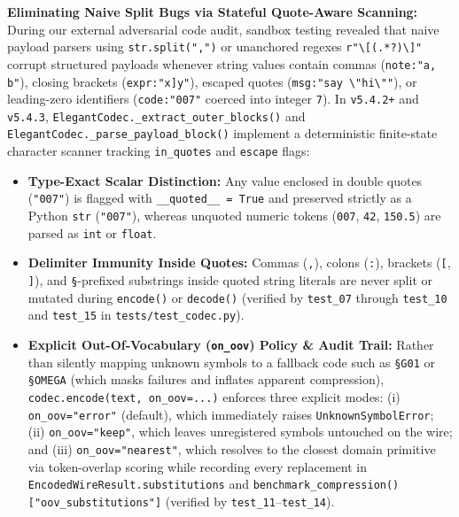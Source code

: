 \documentclass[9pt,a4paper]{extarticle}
\begin{document}
\textbf{Eliminating Naive Split Bugs via Stateful Quote-Aware Scanning:} During our external adversarial code audit, sandbox testing revealed that naive payload parsers using \texttt{str.split(",")} or unanchored regexes \texttt{r"\textbackslash[(.*?)\textbackslash]"} corrupt structured payloads whenever string values contain commas (\texttt{note:"a, b"}), closing brackets (\texttt{expr:"x]y"}), escaped quotes (\texttt{msg:"say \textbackslash"hi\textbackslash""}), or leading-zero identifiers (\texttt{code:"007"} coerced into integer \texttt{7}). In \texttt{v5.4.2+} and \texttt{v5.4.3}, \texttt{ElegantCodec.\allowbreak \_extract\_\allowbreak outer\_\allowbreak blocks()} and \texttt{ElegantCodec.\allowbreak \_parse\_\allowbreak payload\_\allowbreak block()} implement a deterministic finite-state character scanner tracking \texttt{in\_quotes} and \texttt{escape} flags:
\begin{itemize}
  \item \textbf{Type-Exact Scalar Distinction:} Any value enclosed in double quotes (\texttt{"007"}) is flagged with \texttt{\_\_quoted\_\_ = True} and preserved strictly as a Python \texttt{str} (\texttt{"007"}), whereas unquoted numeric tokens (\texttt{007}, \texttt{42}, \texttt{150.5}) are parsed as \texttt{int} or \texttt{float}.
  \item \textbf{Delimiter Immunity Inside Quotes:} Commas (\texttt{,}), colons (\texttt{:}), brackets (\texttt{[}, \texttt{]}), and \texttt{\S}-prefixed substrings inside quoted string literals are never split or mutated during \texttt{encode()} or \texttt{decode()} (verified by \texttt{test\_07} through \texttt{test\_10} and \texttt{test\_15} in \texttt{tests/test\_codec.py}).
  \item \textbf{Explicit Out-Of-Vocabulary (\texttt{on\_oov}) Policy \& Audit Trail:} Rather than silently mapping unknown symbols to a fallback code such as \texttt{\S G01} or \texttt{\S OMEGA} (which masks failures and inflates apparent compression), \texttt{codec.encode(text, on\_oov=...)} enforces three explicit modes: (i) \texttt{on\_oov="error"} (default), which immediately raises \texttt{UnknownSymbolError}; (ii) \texttt{on\_oov="keep"}, which leaves unregistered symbols untouched on the wire; and (iii) \texttt{on\_oov="nearest"}, which resolves to the closest domain primitive via token-overlap scoring while recording every replacement in \texttt{EncodedWireResult.\allowbreak substitutions} and \texttt{benchmark\_compression()["oov\_substitutions"]} (verified by \texttt{test\_11}--\texttt{test\_14}).
\end{itemize}
\end{document}
